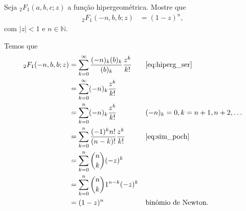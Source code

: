 \documentclass[a4paper,12pt, leqno, answers]{exam}
\begin{document}
\begin{questions}
    \question[P2 de 2006] Seja ${}_2F_1(a, b, c; z)$ a fun\c{c}\~{a}o hipergeom\'{e}trica. Mostre que
    \begin{align*}
        {}_2F_1(-n, b, b; z) &= (1 - z)^n,
    \end{align*}
    com $|z| < 1$ e $n \in \mathbb{N}$.
    \begin{solution}
        Temos que
        \begin{align*}
            {}_2F_1(-n, b, b; z) &= \sum_{k = 0}^\infty \frac{(-n)_k (b)_k}{(b)_k} \frac{z^k}{k!} && \text{\eqref{eq:hiperg_ser}} \\
            &= \sum_{k = 0}^\infty (-n)_k \frac{z^k}{k!} \\
            &= \sum_{k = 0}^n (-n)_k \frac{z^k}{k!} && (-n)_k = 0, k = n + 1, n + 2, \ldots \\
            &= \sum_{k = 0}^n \frac{(-1)^k n!}{(n - k)!} \frac{z^k}{k!} && \text{\eqref{eq:sim_poch}} \\
            &= \sum_{k = 0}^n \binom{n}{k} (-z)^k \\
            &= \sum_{k = 0}^n \binom{n}{k} 1^{n - k} (-z)^k \\
            &= (1 - z)^n && \text{bin\^{o}mio de Newton.}
        \end{align*}
    \end{solution}


\end{questions}
\end{document}
